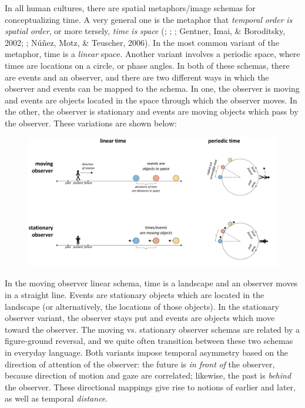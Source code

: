 In all human cultures, there are spatial metaphors/image schemas for conceptualizing time. A very general one is the metaphor that \textit{temporal} \textit{order} \textit{is} \textit{spatial} \textit{order}, or more tersely, \textit{time} \textit{is} \textit{space} (\citealt{Boroditsky20002001}; \citealt{CasasantoBoroditsky2008}; \citealt{Evans2006}; Gentner, Imai, \& Boroditsky, 2002; \citealt{LakoffJohnson1999}; Núñez, Motz, \& Teuscher, 2006). In the most common variant of the metaphor, time is a \textit{linear} space. Another variant involves a periodic space, where times are locations on a circle, or phase angles. In both of these schemas, there are events and an observer, and there are two different ways in which the observer and events can be mapped to the schema. In one, the observer is moving and events are objects located in the space through which the observer moves. In the other, the observer is stationary and events are moving objects which pass by the observer. These variations are shown below:

  
\begin{figure}
\includegraphics[width=\textwidth]{figures/Tilsen-img38.png}
\caption{\missingcaption}
\label{fig:}
\end{figure}
 

  In the moving observer linear schema, time is a landscape and an observer moves in a straight line. Events are stationary objects which are located in the landscape (or alternatively, the locations of those objects). In the stationary observer variant, the observer stays put and events are objects which move toward the observer. The moving vs. stationary observer schemas are related by a figure-ground reversal, and we quite often transition between these two schemas in everyday language. Both variants impose temporal asymmetry based on the direction of attention of the observer: the future is \textit{in} \textit{front} \textit{of} the observer, because direction of motion and gaze are correlated; likewise, the past is \textit{behind} the observer. These directional mappings give rise to notions of earlier and later, as well as temporal \textit{distance}. 

